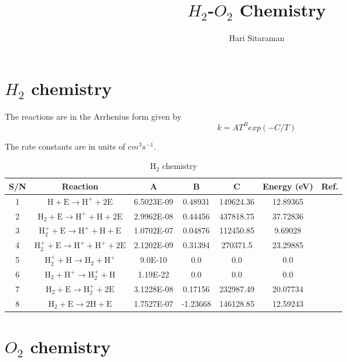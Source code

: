 \documentclass[a4paper,12pt]{article}
\author{Hari Sitaraman}
\title{$H_2$-$O_2$ Chemistry}
\begin{document}
\maketitle

\section{$H_2$ chemistry}

The reactions are in the Arrhenius form given by
\begin{equation}
	k=A T^B exp(-C/T)
\end{equation}

The rate constants are in units of $cm^3 s^{-1}$.

\begin{table}[h] \centering
\caption{$\mathrm{H_2}$ chemistry}
\begin{tabular}{|c|c|c|c|c|c|c|}
\hline
S/N & Reaction & A & B & C & Energy (eV) & Ref. \\
\hline
1   & $\mathrm{H     + E   \rightarrow H^+ + 2E}$       &  6.5023E-09 & 0.48931  & 149624.36 & 12.89365 &\cite{Hchem}\\
2   & $\mathrm{H_2   + E   \rightarrow H^+ + H + 2E}$   &  2.9962E-08 & 0.44456  & 437818.75 & 37.72836 &\cite{Hchem}\\
3   & $\mathrm{H_2^+ + E   \rightarrow H^+ + H + E}$    &  1.0702E-07 & 0.04876  & 112450.85 &  9.69028 &\cite{Hchem}\\
4   & $\mathrm{H_2^+ + E   \rightarrow H^+ + H^+ + 2E}$ &  2.1202E-09 & 0.31394  & 270371.5  & 23.29885 &\cite{Hchem}\\
5   & $\mathrm{H_2^+ + H   \rightarrow H_2 + H^+}$      &  9.0E-10    & 0.0      & 0.0       & 0.0      &\cite{Hchem}\\
6   & $\mathrm{H_2   + H^+ \rightarrow H_2^+ + H}$      &  1.19E-22   & 0.0      & 0.0       & 0.0      &\cite{Hchem}\\
7   & $\mathrm{H_2   + E   \rightarrow H_2^+ + 2E}$     &  3.1228E-08 & 0.17156  & 232987.49 & 20.07734 &\cite{Hchem}\\
8   & $\mathrm{H_2   + E   \rightarrow 2 H   + E}$      &  1.7527E-07 & -1.23668 & 146128.85 & 12.59243 &\cite{Hchem}\\
\hline
\end{tabular}
\end{table}

\section{$O_2$ chemistry}
\end{document}
